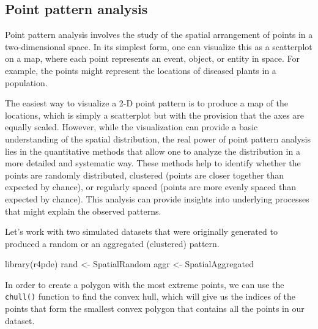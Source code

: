 \documentclass[
  letterpaper,
  DIV=11,
  numbers=noendperiod]{scrreprt}
\newenvironment{Shaded}{\begin{snugshade}}{\end{snugshade}}
\newcommand{\FunctionTok}[1]{\textcolor[rgb]{0.28,0.35,0.67}{#1}}
\newcommand{\NormalTok}[1]{\textcolor[rgb]{0.00,0.23,0.31}{#1}}
\newcommand{\OtherTok}[1]{\textcolor[rgb]{0.00,0.23,0.31}{#1}}
\begin{document}
\hypertarget{point-pattern-analysis}{%
\subsection{Point pattern analysis}\label{point-pattern-analysis}}

Point pattern analysis involves the study of the spatial arrangement of
points in a two-dimensional space. In its simplest form, one can
visualize this as a scatterplot on a map, where each point represents an
event, object, or entity in space. For example, the points might
represent the locations of diseased plants in a population.

The easiest way to visualize a 2-D point pattern is to produce a map of
the locations, which is simply a scatterplot but with the provision that
the axes are equally scaled. However, while the visualization can
provide a basic understanding of the spatial distribution, the real
power of point pattern analysis lies in the quantitative methods that
allow one to analyze the distribution in a more detailed and systematic
way. These methods help to identify whether the points are randomly
distributed, clustered (points are closer together than expected by
chance), or regularly spaced (points are more evenly spaced than
expected by chance). This analysis can provide insights into underlying
processes that might explain the observed patterns.

Let's work with two simulated datasets that were originally generated to
produced a random or an aggregated (clustered) pattern.

\begin{Shaded}
\begin{Highlighting}[]
\FunctionTok{library}\NormalTok{(r4pde)}
\NormalTok{rand }\OtherTok{\textless{}{-}}\NormalTok{ SpatialRandom}
\NormalTok{aggr }\OtherTok{\textless{}{-}}\NormalTok{ SpatialAggregated}
\end{Highlighting}
\end{Shaded}

In order to create a polygon with the most extreme points, we can use
the \texttt{chull()} function to find the convex hull, which will give
us the indices of the points that form the smallest convex polygon that
contains all the points in our dataset.
\end{document}
